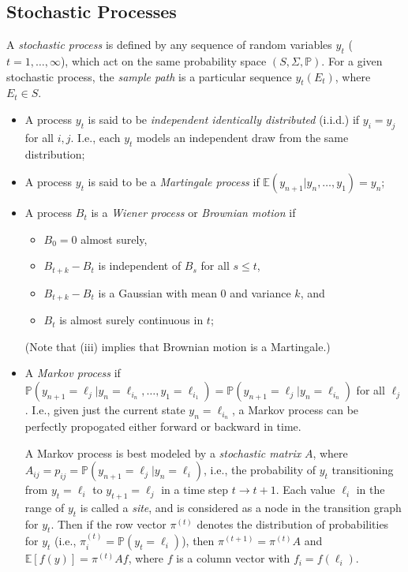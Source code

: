 \documentclass[12pt]{article}
\begin{document}
\subsection*{Stochastic Processes}

A {\it stochastic process} is defined by any sequence of random
variables $y_t$ ($t=1,\ldots,\infty$), which act on the same probability
space $(S, \Sigma, \mathbb{P})$.
For a given stochastic process, the {\it sample path} is a particular
sequence $y_t(E_t)$, where $E_t\in S$.
\begin{itemize}
\item A process $y_t$ is said to be {\it independent identically distributed}
(i.i.d.) if $y_i = y_j$ for all $i,j$. I.e., each $y_t$ models an independent
draw from the same distribution;
\item A process $y_t$ is said to be a {\it Martingale process} if 
	$\mathbb{E}(y_{n+1} | y_n,\ldots,y_1) = y_n$;
\item A process $B_t$ is a {\it Wiener process} or {\it Brownian motion} if
	\begin{itemize}
	\item[(i)] $B_0 = 0$ almost surely,
	\item[(ii)] $B_{t+k} - B_{t}$ is independent of $B_{s}$
	for all $s \leq t$,
\item[(iii)] $B_{t+k} - B_t$ is a Gaussian with mean $0$ and variance
		$k$, and
	\item[(iv)] $B_t$ is almost surely continuous in $t$;
	\end{itemize}
	(Note that (iii) implies that Brownian motion is a Martingale.)
\item A {\it Markov process} if 
$\mathbb{P}(y_{n+1} = \ell_j | y_n = \ell_{i_n}, \ldots, y_1 = \ell_{i_1}) = \mathbb{P}(y_{n+1} = \ell_j | y_n = \ell_{i_n})$ for all $\ell_j$.
I.e., given just the current state $y_n = \ell_{i_n}$, a Markov process can be
perfectly propogated either forward or backward in time.

A Markov process is best modeled by a {\it stochastic matrix} $A$, where
$A_{ij} = p_{ij} = \mathbb{P}(y_{n+1} = \ell_j | y_n = \ell_i)$, i.e.,
the probability of $y_t$ transitioning from $y_t=\ell_i$ to $y_{t+1}=\ell_j$
in a time step $t\rightarrow t+1$. Each value $\ell_i$ in the range of
$y_t$ is called a {\it site}, and is considered as a node in the
transition graph for $y_t$.
Then if the row vector $\pi^{(t)}$ denotes the distribution of
probabilities for $y_t$ (i.e., $\pi^{(t)}_i = \mathbb{P}(y_t = \ell_i)$),
then $\pi^{(t+1)} = \pi^{(t)}A$ and $\mathbb{E}[f(y)] = \pi^{(t)}Af$,
where $f$ is a column vector with $f_i = f(\ell_i)$.


\end{itemize}
\end{document}
